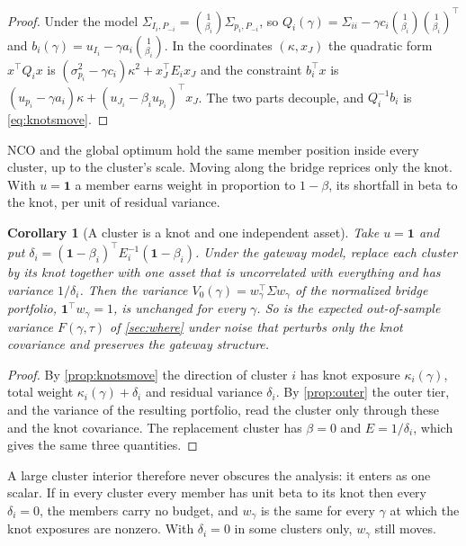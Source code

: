 \documentclass[11pt]{article}
\newcommand{\ones}{\mathbf{1}}
\newtheorem{corollary}{Corollary}
\begin{document}
\begin{proof}
Under the model $\Sigma_{I_i,P_{-i}}=\binom{1}{\beta_i}\Sigma_{p_i,P_{-i}}$,
so $Q_i(\gamma)=\Sigma_{ii}-\gamma c_i\binom{1}{\beta_i}\binom{1}{\beta_i}^{\!\top}$
and $b_i(\gamma)=u_{I_i}-\gamma a_i\binom{1}{\beta_i}$. In the coordinates
$(\kappa,x_J)$ the quadratic form $x^\top Q_ix$ is
$(\sigma_{p_i}^2-\gamma c_i)\kappa^2+x_J^\top E_ix_J$ and the constraint
$b_i^\top x$ is $(u_{p_i}-\gamma a_i)\kappa+(u_{J_i}-\beta_iu_{p_i})^\top x_J$.
The two parts decouple, and $Q_i^{-1}b_i$ is \eqref{eq:knotsmove}.
\end{proof}

NCO and the global optimum hold the same member position inside every
cluster, up to the cluster's scale. Moving along the bridge reprices only
the knot. With $u=\ones$ a member earns weight in proportion to $1-\beta$,
its shortfall in beta to the knot, per unit of residual variance.

\begin{corollary}[A cluster is a knot and one independent asset]
\label{cor:compress}
Take $u=\ones$ and put
$\delta_i=(\ones-\beta_i)^\top E_i^{-1}(\ones-\beta_i)$. Under the gateway
model, replace each cluster by its knot together with one asset that is
uncorrelated with everything and has variance $1/\delta_i$. Then the
variance $V_0(\gamma)=w_\gamma^\top\Sigma w_\gamma$ of the normalized bridge
portfolio, $\ones^\top w_\gamma=1$, is unchanged for every $\gamma$. So is
the expected out-of-sample variance $F(\gamma,\tau)$ of \cref{sec:where}
under noise that perturbs only the knot covariance and preserves the
gateway structure.
\end{corollary}

\begin{proof}
By \cref{prop:knotsmove} the direction of cluster $i$ has knot exposure
$\kappa_i(\gamma)$, total weight $\kappa_i(\gamma)+\delta_i$ and residual
variance $\delta_i$. By \cref{prop:outer} the outer tier, and the variance
of the resulting portfolio, read the cluster only through these and the
knot covariance. The replacement cluster has $\beta=0$ and $E=1/\delta_i$,
which gives the same three quantities.
\end{proof}

A large cluster interior therefore never obscures the analysis: it enters
as one scalar. If in every cluster every member has unit beta to its knot
then every $\delta_i=0$, the members carry no budget, and $w_\gamma$ is the
same for every $\gamma$ at which the knot exposures are nonzero. With
$\delta_i=0$ in some clusters only, $w_\gamma$ still moves.
\end{document}
